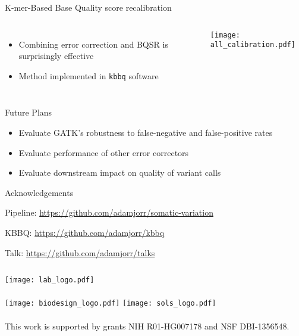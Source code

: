 \documentclass{beamer}
\begin{document}
\begin{frame}{K-mer-Based Base Quality score recalibration}
\begin{columns}
\begin{itemize}
\item Combining error correction and BQSR is surprisingly effective
\item Method implemented in \texttt{kbbq} software
\end{itemize}
\texttt{[image: all\_calibration.pdf]}
\end{columns}
\end{frame}

\begin{frame}{Future Plans}
\begin{itemize}
\item Evaluate GATK's robustness to false-negative and false-positive rates
\item Evaluate performance of other error correctors
\item Evaluate downstream impact on quality of variant calls
\end{itemize}
\end{frame}

\begin{frame}{Acknowledgements}

Pipeline:  \url{https://github.com/adamjorr/somatic-variation}

KBBQ:  \url{https://github.com/adamjorr/kbbq}

Talk:  \url{https://github.com/adamjorr/talks}

\vfill

\begin{columns}
	\texttt{[image: lab\_logo.pdf]}
	\\~\\
	\texttt{[image: biodesign\_logo.pdf]}
	\texttt{[image: sols\_logo.pdf]}
	\\~\\
	This work is supported by grants NIH R01-HG007178 and NSF DBI-1356548.
\end{columns}

\end{frame}
\end{document}

